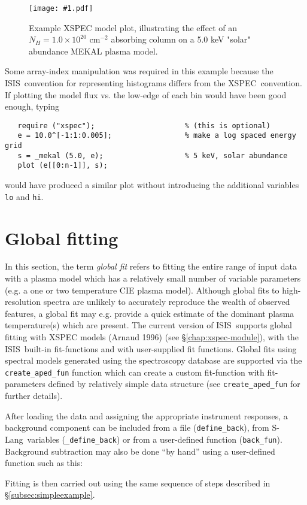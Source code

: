 \documentclass{book}
\newcommand{\putfig}[1]{\texttt{[image: \#1.pdf]}}
\newcommand{\putfig}[1]{\psfig{file=#1.ps}}
\newcommand{\isisx}{{\sc ISIS~}}
\newcommand{\slang}{{\sc S-Lang}}
\newcommand{\xspec}{{\sc XSPEC}}
\begin{document}
{

\begin{figure}[ht]
\putfig{figures/xspec}
\caption{Example XSPEC model plot, illustrating the effect of an $N_H = 1.0 \times
10^{20}$ cm${}^{-2}$ absorbing column on a 5.0 keV "solar" abundance MEKAL
plasma model.}
\label{fig:xspec}
\end{figure}

Some array-index manipulation was required in this example because the
\isisx convention for representing histograms differs from the
\xspec\ convention. If plotting the model flux vs. the low-edge of each bin would
have been good enough, typing
 \begin{verbatim}
   require ("xspec");                     % (this is optional)
   e = 10.0^[-1:1:0.005];                 % make a log spaced energy grid
   s = _mekal (5.0, e);                   % 5 keV, solar abundance
   plot (e[[0:n-1]], s);
 \end{verbatim}
would have produced a similar plot without introducing the
additional variables {\tt lo} and {\tt hi}.

\section{Global fitting}

In this section, the term {\it global fit} refers to fitting the
entire range of input data with a plasma model which has a
relatively small number of variable parameters (e.g. a one or two
temperature CIE plasma model). Although global fits to
high-resolution spectra are unlikely to accurately reproduce the
wealth of observed features, a global fit may e.g. provide a quick
estimate of the dominant plasma temperature(s) which are present.
The current version of \isisx supports global fitting with {\sc
XSPEC} models (Arnaud 1996) (see \S\ref{chap:xspec-module}), with
the \isisx built-in fit-functions and with user-supplied fit
functions. Global fits using spectral models generated using the
spectroscopy database are supported via the \verb|create_aped_fun|
function which can create a custom fit-function with
fit-parameters defined by relatively simple data structure
(see \verb|create_aped_fun| for further details).

After loading the data and assigning the appropriate instrument
responses, a background component can be included from a file
(\verb|define_back|), from \slang\ variables (\verb|_define_back|)
or from a user-defined function (\verb|back_fun|).  Background
subtraction may also be done ``by hand'' using a user-defined
function such as this:

Fitting is then carried out using the same sequence of steps
described in \S\ref{subsec:simpleexample}.

}
\end{document}
